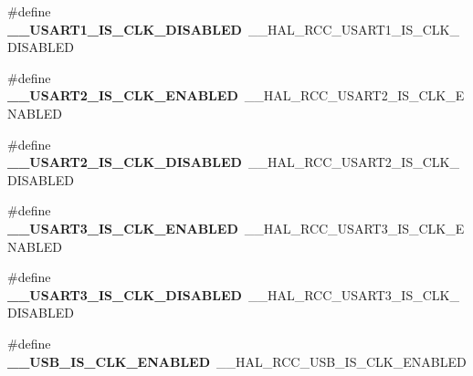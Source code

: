 \begin{DoxyCompactItemize}
\item 
\hypertarget{group___h_a_l___r_c_c___aliased_ga5fe42363e1af6ecad731290b6e295865}{\#define {\bfseries \-\_\-\-\_\-\-U\-S\-A\-R\-T1\-\_\-\-I\-S\-\_\-\-C\-L\-K\-\_\-\-D\-I\-S\-A\-B\-L\-E\-D}~\-\_\-\-\_\-\-H\-A\-L\-\_\-\-R\-C\-C\-\_\-\-U\-S\-A\-R\-T1\-\_\-\-I\-S\-\_\-\-C\-L\-K\-\_\-\-D\-I\-S\-A\-B\-L\-E\-D}\label{group___h_a_l___r_c_c___aliased_ga5fe42363e1af6ecad731290b6e295865}

\item 
\hypertarget{group___h_a_l___r_c_c___aliased_gab3ab022f37b6c36986ce59b53a092bda}{\#define {\bfseries \-\_\-\-\_\-\-U\-S\-A\-R\-T2\-\_\-\-I\-S\-\_\-\-C\-L\-K\-\_\-\-E\-N\-A\-B\-L\-E\-D}~\-\_\-\-\_\-\-H\-A\-L\-\_\-\-R\-C\-C\-\_\-\-U\-S\-A\-R\-T2\-\_\-\-I\-S\-\_\-\-C\-L\-K\-\_\-\-E\-N\-A\-B\-L\-E\-D}\label{group___h_a_l___r_c_c___aliased_gab3ab022f37b6c36986ce59b53a092bda}

\item 
\hypertarget{group___h_a_l___r_c_c___aliased_gab5889d1f5773072ac716fecf8e03f555}{\#define {\bfseries \-\_\-\-\_\-\-U\-S\-A\-R\-T2\-\_\-\-I\-S\-\_\-\-C\-L\-K\-\_\-\-D\-I\-S\-A\-B\-L\-E\-D}~\-\_\-\-\_\-\-H\-A\-L\-\_\-\-R\-C\-C\-\_\-\-U\-S\-A\-R\-T2\-\_\-\-I\-S\-\_\-\-C\-L\-K\-\_\-\-D\-I\-S\-A\-B\-L\-E\-D}\label{group___h_a_l___r_c_c___aliased_gab5889d1f5773072ac716fecf8e03f555}

\item 
\hypertarget{group___h_a_l___r_c_c___aliased_ga2d73a8b92c06fcea1ec92c9031ef2462}{\#define {\bfseries \-\_\-\-\_\-\-U\-S\-A\-R\-T3\-\_\-\-I\-S\-\_\-\-C\-L\-K\-\_\-\-E\-N\-A\-B\-L\-E\-D}~\-\_\-\-\_\-\-H\-A\-L\-\_\-\-R\-C\-C\-\_\-\-U\-S\-A\-R\-T3\-\_\-\-I\-S\-\_\-\-C\-L\-K\-\_\-\-E\-N\-A\-B\-L\-E\-D}\label{group___h_a_l___r_c_c___aliased_ga2d73a8b92c06fcea1ec92c9031ef2462}

\item 
\hypertarget{group___h_a_l___r_c_c___aliased_ga63cc13fc0f33d6f17bf36333cb2d3b54}{\#define {\bfseries \-\_\-\-\_\-\-U\-S\-A\-R\-T3\-\_\-\-I\-S\-\_\-\-C\-L\-K\-\_\-\-D\-I\-S\-A\-B\-L\-E\-D}~\-\_\-\-\_\-\-H\-A\-L\-\_\-\-R\-C\-C\-\_\-\-U\-S\-A\-R\-T3\-\_\-\-I\-S\-\_\-\-C\-L\-K\-\_\-\-D\-I\-S\-A\-B\-L\-E\-D}\label{group___h_a_l___r_c_c___aliased_ga63cc13fc0f33d6f17bf36333cb2d3b54}

\item 
\hypertarget{group___h_a_l___r_c_c___aliased_ga5beb46cff0e9eef7513008300787779a}{\#define {\bfseries \-\_\-\-\_\-\-U\-S\-B\-\_\-\-I\-S\-\_\-\-C\-L\-K\-\_\-\-E\-N\-A\-B\-L\-E\-D}~\-\_\-\-\_\-\-H\-A\-L\-\_\-\-R\-C\-C\-\_\-\-U\-S\-B\-\_\-\-I\-S\-\_\-\-C\-L\-K\-\_\-\-E\-N\-A\-B\-L\-E\-D}\label{group___h_a_l___r_c_c___aliased_ga5beb46cff0e9eef7513008300787779a}


\end{DoxyCompactItemize}
